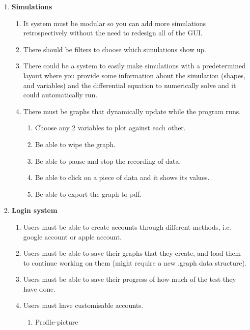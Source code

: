 \documentclass[12pt]{article}
\begin{document}
\begin{enumerate}[label=\textbf{\arabic*}.]
\begin{enumerate}[label*=\textbf{\arabic*}.]
\begin{enumerate}[label*=\textbf{\arabic*}.]
        \end{enumerate}
    \end{enumerate}
    \item \textbf{Simulations}
    \begin{enumerate}[label*=\textbf{\arabic*}.]
        \item It system must be modular so you can add more simulations retrospectively without the need to redesign all of the GUI.
        \item There should be filters to choose which simulations show up.
        \item There could be a system to easily make simulations with a predetermined layout where you provide some information about the simulation (shapes, and variables) and the differential equation to numerically solve and it could automatically run.
        \item There must be graphs that dynamically update while the program runs.
        \begin{enumerate}[label*=\textbf{\arabic*}.]
            \item Choose any 2 variables to plot against each other.
            \item Be able to wipe the graph.
            \item Be able to pause and stop the recording of data.
            \item Be able to click on a piece of data and it shows its values.
            \item Be able to export the graph to pdf.
        \end{enumerate}
    \end{enumerate}
    \item \textbf{Login system}
    \begin{enumerate}[label*=\textbf{\arabic*}.]
        \item Users must be able to create accounts through different methods, i.e. google account or apple account.
        \item Users must be able to save their graphs that they create, and load them to continue working on them (might require a new .graph data structure).
        \item Users must be able to save their progress of how much of the test they have done.
        \item Users must have customisable accounts.
        \begin{enumerate}[label*=\textbf{\arabic*}.]
            \item Profile-picture

\end{enumerate}
\end{enumerate}
\end{enumerate}
\end{document}
